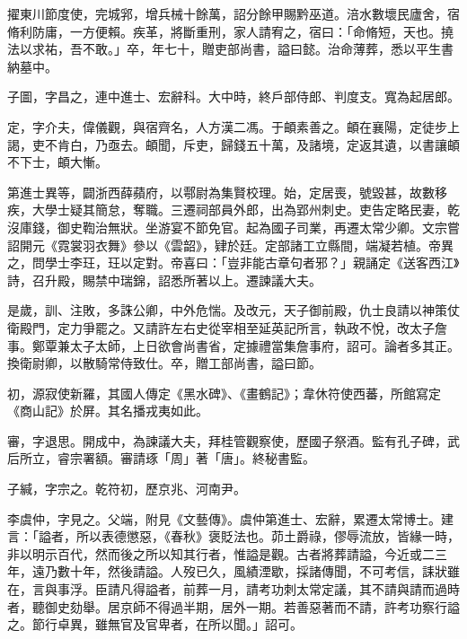 \begin{pinyinscope}
 擢東川節度使，完城郛，增兵械十餘萬，詔分餘甲賜黔巫道。涪水數壞民廬舍，宿脩利防庸，一方便賴。疾革，將斷重刑，家人請宥之，宿曰：「命脩短，天也。撓法以求祐，吾不敢。」卒，年七十，贈吏部尚書，謚曰懿。治命薄葬，悉以平生書納墓中。



 子圖，字昌之，連中進士、宏辭科。大中時，終戶部侍郎、判度支。寬為起居郎。



 定，字介夫，偉儀觀，與宿齊名，人方漢二馮。于頔素善之。頔在襄陽，定徒步上謁，吏不肯白，乃亟去。頔聞，斥吏，歸錢五十萬，及諸境，定返其遺，以書讓頔不下士，頔大慚。



 第進士異等，闢浙西薛蘋府，以鄠尉為集賢校理。始，定居喪，號毀甚，故數移疾，大學士疑其簡怠，奪職。三遷祠部員外郎，出為郢州刺史。吏告定略民妻，乾沒庫錢，御史鞫治無狀。坐游宴不節免官。起為國子司業，再遷太常少卿。文宗嘗詔開元《霓裳羽衣舞》參以《雲韶》，肄於廷。定部諸工立縣間，端凝若植。帝異之，問學士李玨，玨以定對。帝喜曰：「豈非能古章句者邪？」親誦定《送客西江》詩，召升殿，賜禁中瑞錦，詔悉所著以上。遷諫議大夫。



 是歲，訓、注敗，多誅公卿，中外危惴。及改元，天子御前殿，仇士良請以神策仗衛殿門，定力爭罷之。又請許左右史從宰相至延英記所言，執政不悅，改太子詹事。鄭覃兼太子太師，上日欲會尚書省，定據禮當集詹事府，詔可。論者多其正。換衛尉卿，以散騎常侍致仕。卒，贈工部尚書，謚曰節。



 初，源寂使新羅，其國人傳定《黑水碑》、《畫鶴記》；韋休符使西蕃，所館寫定《商山記》於屏。其名播戎夷如此。



 審，字退思。開成中，為諫議大夫，拜桂管觀察使，歷國子祭酒。監有孔子碑，武后所立，睿宗署額。審請琢「周」著「唐」。終秘書監。



 子緘，字宗之。乾符初，歷京兆、河南尹。



 李虞仲，字見之。父端，附見《文藝傳》。虞仲第進士、宏辭，累遷太常博士。建言：「謚者，所以表德懲惡，《春秋》褒貶法也。茆土爵祿，僇辱流放，皆緣一時，非以明示百代，然而後之所以知其行者，惟謚是觀。古者將葬請謚，今近或二三年，遠乃數十年，然後請謚。人歿已久，風績湮歇，採諸傳聞，不可考信，誄狀雖在，言與事浮。臣請凡得謚者，前葬一月，請考功刺太常定議，其不請與請而過時者，聽御史劾舉。居京師不得過半期，居外一期。若善惡著而不請，許考功察行謚之。節行卓異，雖無官及官卑者，在所以聞。」詔可。




\end{pinyinscope}
